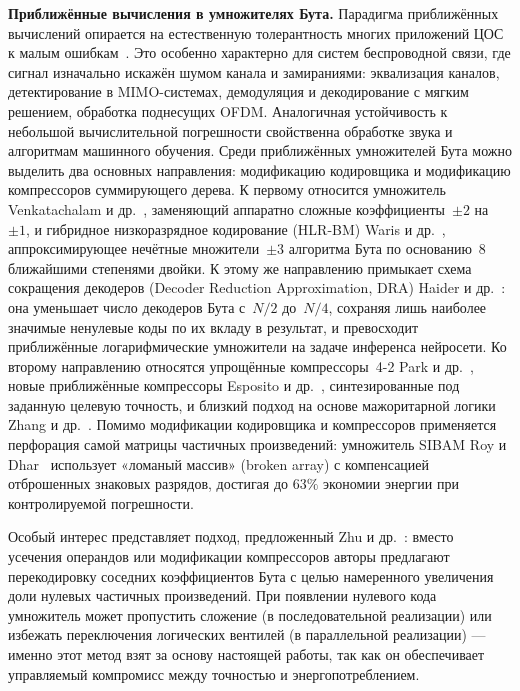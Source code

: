 \documentclass[a4paper, 12pt, oneside]{report}
\begin{document}
\textbf{Приближённые вычисления в умножителях Бута.} Парадигма
приближённых вычислений опирается на естественную толерантность
многих приложений ЦОС к малым ошибкам~\cite{hanorshansky2013}. Это
особенно характерно для систем беспроводной связи, где сигнал изначально
искажён шумом канала и замираниями: эквализация каналов, детектирование
в MIMO-системах, 
демодуляция и декодирование с мягким решением, обработка поднесущих
OFDM. Аналогичная устойчивость к небольшой вычислительной погрешности
свойственна обработке звука и алгоритмам машинного обучения. Среди приближённых
умножителей Бута можно выделить два основных направления: модификацию
кодировщика и модификацию компрессоров суммирующего дерева. К первому
относится умножитель Venkatachalam и др.~\cite{venkatachalam2019},
заменяющий аппаратно сложные коэффициенты~$\pm2$ на~$\pm1$, и
гибридное низкоразрядное кодирование (HLR-BM) Waris и
др.~\cite{waris2020}, аппроксимирующее нечётные множители~$\pm3$
алгоритма Бута по основанию~8 ближайшими степенями двойки. К этому же
направлению примыкает схема сокращения декодеров (Decoder Reduction
Approximation, DRA) Haider и др.~\cite{haider2024}: она уменьшает число
декодеров Бута с~$N/2$ до~$N/4$, сохраняя лишь наиболее значимые
ненулевые коды по их вкладу в результат, и превосходит приближённые
логарифмические умножители на задаче инференса нейросети. Ко второму
направлению относятся упрощённые компрессоры~4-2 Park и
др.~\cite{parkkunglee2023}, новые приближённые компрессоры Esposito и
др.~\cite{esposito2018comp}, синтезированные под заданную целевую
точность, и близкий подход на основе мажоритарной логики Zhang и
др.~\cite{zhang2022}. Помимо модификации кодировщика и компрессоров
применяется перфорация самой матрицы частичных произведений: умножитель
SIBAM Roy и Dhar~\cite{roy2020} использует «ломаный массив» (broken
array) с компенсацией отброшенных знаковых разрядов, достигая до
$63\%$ экономии энергии при контролируемой погрешности.

Особый интерес представляет подход, предложенный Zhu и
др.~\cite{zhu2025}: вместо усечения операндов или модификации
компрессоров авторы предлагают перекодировку соседних коэффициентов
Бута с целью намеренного увеличения доли нулевых частичных
произведений. При появлении нулевого кода умножитель может пропустить
сложение (в последовательной реализации) или избежать переключения
логических вентилей (в параллельной реализации) — именно этот метод
взят за основу настоящей работы, так как он обеспечивает управляемый
компромисс между точностью и энергопотреблением.
\end{document}
